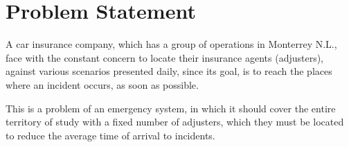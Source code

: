 \section{Problem Statement}
A car insurance company,
which has a group of operations in Monterrey N.L.,
face with the constant concern
to locate their insurance agents (adjusters),
against various scenarios presented daily,
since its goal,
is to reach the places where an incident occurs,
as soon as possible.

This is a problem of an emergency system, %
in which
it should cover the entire territory of study
with a fixed number of adjusters,
which they must be located
to reduce the average time of arrival to incidents.
